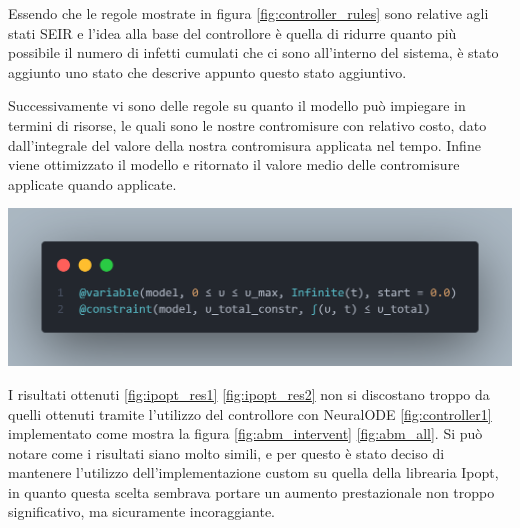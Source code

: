Essendo che le regole mostrate in figura \ref{fig:controller_rules} sono relative agli stati 
SEIR e l'idea alla base del controllore è quella di ridurre quanto più possibile il numero di
infetti cumulati che ci sono all'interno del sistema, è stato aggiunto uno stato che descrive
appunto questo stato aggiuntivo.

Successivamente vi sono delle regole su quanto il modello può impiegare in termini di risorse, 
le quali sono le nostre contromisure con relativo costo, dato dall'integrale del valore della nostra
contromisura applicata nel tempo. Infine viene ottimizzato il modello e ritornato il valore medio delle contromisure applicate
quando applicate. 

\begin{minipage}{\linewidth}
	\centering
	\includegraphics[width=\textwidth]{img/controller_rules_1.png}
	\label{fig:controller_rules_1}
\end{minipage}

I risultati ottenuti \ref{fig:ipopt_res1} \ref{fig:ipopt_res2} non si discostano troppo da quelli ottenuti tramite l'utilizzo del controllore con 
NeuralODE \ref{fig:controller1} implementato come mostra la figura \ref{fig:abm_intervent} \ref{fig:abm_all}. Si può notare
come i risultati siano molto simili, e per questo è stato deciso di mantenere l'utilizzo dell'implementazione 
custom su quella della librearia Ipopt, in quanto questa scelta sembrava portare un aumento prestazionale non 
troppo significativo, ma sicuramente incoraggiante.

